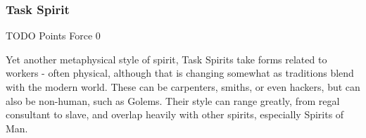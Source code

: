 \begin{multicols*}{3}
	\subsubsection{Task Spirit}
	\begin{flushright}
		TODO Points Force 0
	\end{flushright}
	
	Yet another metaphysical style of spirit, Task Spirits take forms related to workers - often physical, although that is changing somewhat as traditions blend with the modern world. These can be carpenters, smiths, or even hackers, but can also be non-human, such as Golems. Their style can range greatly, from regal consultant to slave, and overlap heavily with other spirits, especially Spirits of Man.
	
\end{multicols*}